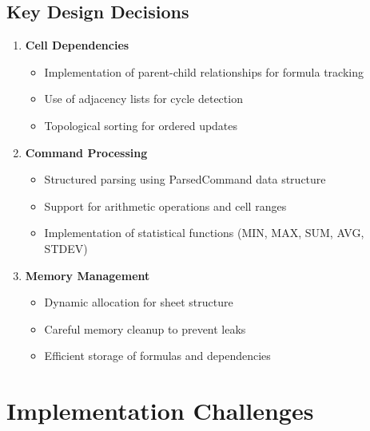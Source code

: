 \documentclass{article}
\begin{document}
\subsection{Key Design Decisions}
\begin{enumerate}
    \item \textbf{Cell Dependencies}
    \begin{itemize}
        \item Implementation of parent-child relationships for formula tracking
        \item Use of adjacency lists for cycle detection
        \item Topological sorting for ordered updates
    \end{itemize}

    \item \textbf{Command Processing}
    \begin{itemize}
        \item Structured parsing using ParsedCommand data structure
        \item Support for arithmetic operations and cell ranges
        \item Implementation of statistical functions (MIN, MAX, SUM, AVG, STDEV)
    \end{itemize}

    \item \textbf{Memory Management}
    \begin{itemize}
        \item Dynamic allocation for sheet structure
        \item Careful memory cleanup to prevent leaks
        \item Efficient storage of formulas and dependencies
    \end{itemize}
\end{enumerate}

\section{Implementation Challenges}
\end{document}
